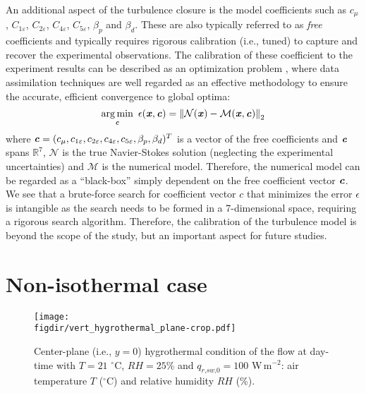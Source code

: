An additional aspect of the turbulence closure is the model coefficients such as $c_{\mu}$, $C_{1\varepsilon}$, $C_{2\varepsilon}$, $C_{4\varepsilon}$, $C_{5\varepsilon}$, $\beta_p$ and $\beta_d$. These are also typically referred to as \textit{free} coefficients and typically requires rigorous calibration (i.e., tuned) to capture and recover the experimental observations. The calibration of these coefficient to the experiment results can be described as an optimization problem \citep{Margheri2014, Duraisamy2018, Couplet2005, Najm2009, Lucor2007, Gorle2015a, Gorle2013}, where data assimilation techniques are well regarded as an effective methodology to ensure the accurate, efficient convergence to global optima:
\begin{equation}
\mathop {\arg \min }\limits_{\textbf{\textit{c}}}\ \epsilon(\textbf{\textit{x}}, \textbf{\textit{c}}) = \left\| {\mathcal{N}(\textbf{\textit{x}}) - \mathcal{M}(\textbf{\textit{x}},\textbf{\textit{c}})} \right\|_2 
\end{equation}
where $\textbf{\textit{c}}=({{c_\mu },{c_{1\varepsilon }},{c_{2\varepsilon }},{c_{4\varepsilon }},{c_{5\varepsilon }},{\beta _p},{\beta _d}})^T$ is a vector of the free coefficients and $\textbf{\textit{c}}$ spans $\mathbb{R}^7$, $\mathcal{N}$ is the true Navier-Stokes solution (neglecting the experimental uncertainties) and $\mathcal{M}$ is the numerical model. Therefore, the numerical model can be regarded as a ``black-box'' simply dependent on the free coefficient vector $\textbf{\textit{c}}$. We see that a brute-force search for coefficient vector $c$ that minimizes the error $\epsilon$ is intangible as the search needs to be formed in a 7-dimensional space, requiring a rigorous search algorithm. Therefore, the calibration of the turbulence model is beyond the scope of the study, but an important aspect for future studies. 

\section{Non-isothermal case}

\begin{figure}[t]
	\centering
	\texttt{[image: \\figdir/vert\_hygrothermal\_plane-crop.pdf]}
	\caption{Center-plane (i.e., $y=0$) hygrothermal condition of the flow at day-time with $T = 21$ $^{\circ}$C, $\textit{RH}=25$\% and $q_{\textit{r,sw,0}} = 100$ W\,m$^{-2}$:  air temperature $T$ ($^{\circ}$C) and  relative humidity $\mathit{RH}$ (\%).}
	\label{fig:vert_hygrothermal_plane}
\end{figure}

